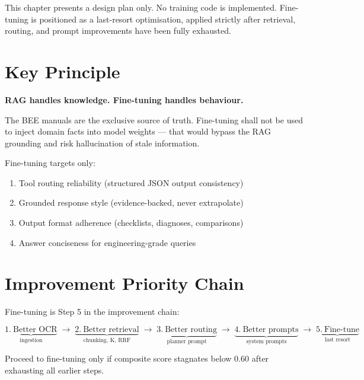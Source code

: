 \documentclass[12pt,a4paper]{report}
\begin{document}
\begin{keybox}
This chapter presents a design plan only. No training code is implemented. Fine-tuning is positioned as a last-resort optimisation, applied strictly after retrieval, routing, and prompt improvements have been fully exhausted.
\end{keybox}

\section{Key Principle}

\begin{mdframed}
\textbf{RAG handles knowledge. Fine-tuning handles behaviour.}

The BEE manuals are the exclusive source of truth. Fine-tuning shall not be used to inject domain facts into model weights --- that would bypass the RAG grounding and risk hallucination of stale information.
\end{mdframed}

Fine-tuning targets only:
\begin{enumerate}
  \item Tool routing reliability (structured JSON output consistency)
  \item Grounded response style (evidence-backed, never extrapolate)
  \item Output format adherence (checklists, diagnoses, comparisons)
  \item Answer conciseness for engineering-grade queries
\end{enumerate}

\section{Improvement Priority Chain}

Fine-tuning is Step 5 in the improvement chain:

\begin{equation*}
  \underbrace{1.\ \text{Better OCR}}_{\text{ingestion}} \;\longrightarrow\;
  \underbrace{2.\ \text{Better retrieval}}_{\text{chunking, K, RRF}} \;\longrightarrow\;
  \underbrace{3.\ \text{Better routing}}_{\text{planner prompt}} \;\longrightarrow\;
  \underbrace{4.\ \text{Better prompts}}_{\text{system prompts}} \;\longrightarrow\;
  \underbrace{5.\ \text{Fine-tune}}_{\text{last resort}}
\end{equation*}

Proceed to fine-tuning only if composite score stagnates below 0.60 after exhausting all earlier steps.
\end{document}
